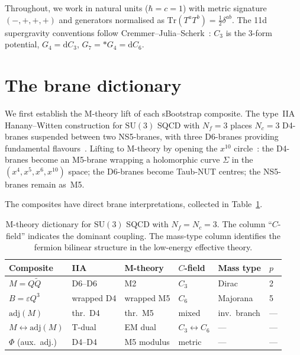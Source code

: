 \documentclass[aps,prd,twocolumn,showpacs,preprintnumbers,superscriptaddress,floatfix]{revtex4-2}
\newcommand{\SU}{\mathrm{SU}}
\newcommand{\Nf}{N_{\!f}}
\newcommand{\Nc}{N_{\!c}}
\newcommand{\Tr}{\mathrm{Tr}}
\newcommand{\adj}{\mathrm{adj}}
\newcommand{\dd}{\mathrm{d}}
\begin{document}
Throughout, we work in natural units ($\hbar = c = 1$)
with metric signature $(-,+,+,+)$ and generators normalised as
$\Tr(T^a T^b) = \frac{1}{2}\delta^{ab}$.
The 11d supergravity conventions follow
Cremmer--Julia--Scherk~\cite{CremmerJuliaScherk:1978}: $C_3$ is
the 3-form potential, $G_4 = \dd C_3$, $G_7 = *G_4 = \dd C_6$.


\section{The brane dictionary}
\label{sec:dictionary}

We first establish the M-theory lift of each sBootstrap composite.
The type~IIA Hanany--Witten construction for $\SU(3)$ SQCD with
$\Nf = 3$ places $\Nc = 3$ D4-branes suspended between two
NS5-branes, with three D6-branes providing fundamental
flavours~\cite{HananyWitten:1997}.
Lifting to M-theory by opening the $x^{10}$
circle~\cite{Witten:1997M5}:
the D4-branes become an M5-brane wrapping a holomorphic curve
$\Sigma$ in the $(x^4, x^5, x^6, x^{10})$ space;
the D6-branes become Taub-NUT centres; the NS5-branes remain
as~M5.

The composites have direct brane interpretations, collected in
Table~\ref{tab:dictionary}.

\begin{table}
\centering\small
\caption{M-theory dictionary for $\SU(3)$ SQCD with $\Nf = \Nc = 3$.
  The column ``$C$-field'' indicates the dominant coupling.
  The mass-type column identifies the fermion bilinear structure
  in the low-energy effective theory.}
\label{tab:dictionary}
\begin{tabular}{llllll}
\toprule
Composite & IIA & M-theory & $C$-field & Mass type & $p$ \\
\midrule
$M = Q\tilde{Q}$ & D6--D6 & M2 & $C_3$ & Dirac & 2 \\
$B = \varepsilon Q^3$ & wrapped D4 & wrapped M5 & $C_6$ & Majorana & 5 \\
$\adj(M)$ & thr.\ D4 & thr.\ M5 & mixed & inv.\ branch & --- \\
$M \leftrightarrow \adj(M)$ & T-dual & EM dual & $C_3{\leftrightarrow}C_6$ & --- & --- \\
$\Phi$ (aux.\ adj.) & D4--D4 & M5 modulus & metric & --- & --- \\
\bottomrule
\end{tabular}
\end{table}
\end{document}
